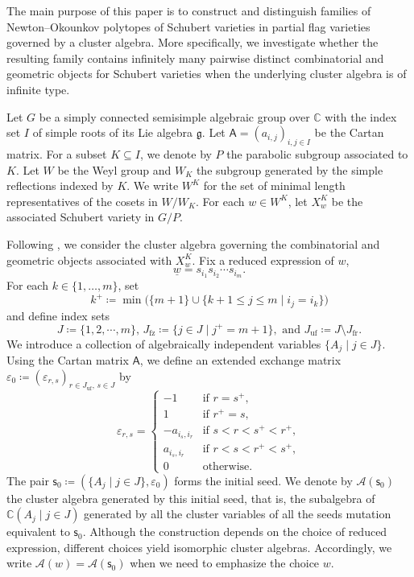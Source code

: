 \documentclass[11pt]{amsart}
\newcommand{\C}{\mathbb{C}}
\numberwithin{equation}{section}
\theoremstyle{plain}
\theoremstyle{definition}
\numberwithin{equation}{section}
\newcommand{\rxw}{\underline{w}}
\newcommand{\fr}{\mathrm{fr}}
\newcommand{\uf}{\mathrm{uf}}
\newcommand{\seed}{\mathsf{s}}
\begin{document}
The main purpose of this paper is to construct and distinguish families of Newton--Okounkov polytopes of Schubert varieties in partial flag varieties governed by a cluster algebra.  More specifically, we investigate whether the resulting family contains infinitely many pairwise distinct combinatorial and geometric objects for Schubert varieties when the underlying cluster algebra is of infinite type.

Let $G$ be a simply connected semisimple algebraic group over $\C$ with the index set $I$ of simple roots of its Lie algebra $\mathfrak{g}$. Let $\textsf{A} = (a_{i,j})_{i,j\in I}$ be the Cartan matrix. For a subset $K \subseteq I$, we denote by $P$ the parabolic subgroup associated to $K$. Let $W$ be the Weyl group and $W_K$ the subgroup generated by the simple reflections indexed by $K$. We write $W^K$ for the set of minimal length representatives of the cosets in $W / W_K$. For each $w \in W^K$, let $X^K_w$ be the associated Schubert variety in $G/P$. 

Following \cite{BFZ05, Williams13, GLS11, GY17, FO25}, we consider the cluster algebra governing the combinatorial and geometric objects associated with $X_w^K$. Fix a reduced expression of $w$,
$$
\rxw = s_{i_1} s_{i_2} \cdots s_{i_m}.
$$
For each $k \in \{1, \dots, m\}$, set 
$$
k^+ \coloneqq \min \bigl(  \{ m+1 \} \cup \{  k+1 \leq j \leq m \mid i_j = i_k \} \bigr)
$$ 
and define index sets
$$
J \coloneqq \{ 1,2, \cdots, m \}, \, J_\mathrm{fz} \coloneqq \{ j \in J \mid j^+ = m+1 \}, \mbox{ and } J_\uf \coloneqq J \setminus J_\fr.
$$
We introduce a collection of algebraically independent variables $\{ A_{j} \mid j \in J \}$. Using the Cartan matrix $\textsf{A}$, we define an extended exchange matrix $\varepsilon_{0} \coloneqq (\varepsilon_{r,s})_{r \in J_{\uf},\, s \in J}$ by
\begin{equation}\label{equ_GLSseed}
\varepsilon_{r,s} =
\begin{cases}
-1 & \text{if } r = s^+, \\
1 & \text{if } r^+ = s, \\
-a_{i_s,i_r} & \text{if } s < r < s^+ < r^+, \\
a_{i_s,i_r} & \text{if } r < s < r^+ < s^+, \\
0 & \text{otherwise.}
\end{cases}
\end{equation}
The pair $\seed_0 \coloneqq (\{ A_{j} \mid j \in J \}, \varepsilon_{0})$ forms the initial seed. We denote by $\mathcal{A}(\seed_0)$ the cluster algebra generated by this initial seed, that is, the subalgebra of $\C( A_{j} \mid j \in J )$ generated by all the cluster variables of all the seeds mutation equivalent to $\seed_0$. Although the construction depends on the choice of reduced expression, different choices yield isomorphic cluster algebras. Accordingly, we write $\mathcal{A}(w) = \mathcal{A}(\seed_0)$ when we need to emphasize the choice $w$.
\end{document}
